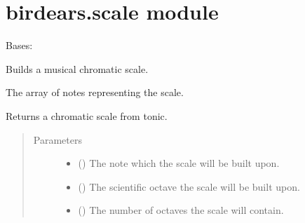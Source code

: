 \documentclass[letterpaper,10pt,english]{sphinxmanual}
\begin{document}
\section{birdears.scale module}
\label{\detokenize{index:module-birdears.scale}}\label{\detokenize{index:birdears-scale-module}}

\begin{fulllineitems}
\label{\detokenize{index:birdears.scale.ChromaticScale}}
Bases: {\hyperref[\detokenize{index:birdears.scale.ScaleBase}]{}}

Builds a musical chromatic scale.

\begin{fulllineitems}
\label{\detokenize{index:birdears.scale.ChromaticScale.scale}}
 \textendash{} The array of notes representing the scale.

\end{fulllineitems}


\begin{fulllineitems}
\label{\detokenize{index:birdears.scale.ChromaticScale.__init__}}
Returns a chromatic scale from tonic.
\begin{quote}\begin{description}
\item[{Parameters}] \leavevmode\begin{itemize}
\item {} 
 () \textendash{} The note which the scale will be built upon.

\item {} 
 () \textendash{} The scientific octave the scale will be built upon.

\item {} 
 () \textendash{} The number of octaves the scale will contain.


\end{itemize}
\end{description}
\end{quote}
\end{fulllineitems}
\end{fulllineitems}
\end{document}
